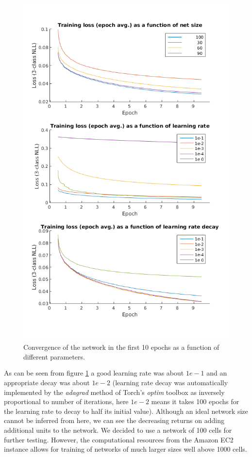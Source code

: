 \documentclass{acm_proc_article-sp}
\begin{document}
\begin{figure}
 \centering
 \includegraphics[scale=.5]{./figures/parameterSearch.png}
 \caption{Convergence of the network in the first 10 epochs as a function of different parameters.}
 \label{fig:paramSearch}
\end{figure}

As can be seen from figure \ref{fig:paramSearch} a good learning rate was about $1e-1$ and an appropriate decay was about $1e-2$ (learning rate decay was automatically implemented by the \textit{adagrad} method of Torch's \textit{optim} toolbox as inversely proportional to number of iterations, here $1e-2$ means it takes 100 epochs for the learning rate to decay to half its initial value). Although an ideal network size cannot be inferred from here, we can see the decreasing returns on adding additional units to the network. We decided to use a network of 100 cells for further testing. However, the computational resources from the Amazon EC2 instance allows for training of networks of much larger sizes well above 1000 cells.
\end{document}
